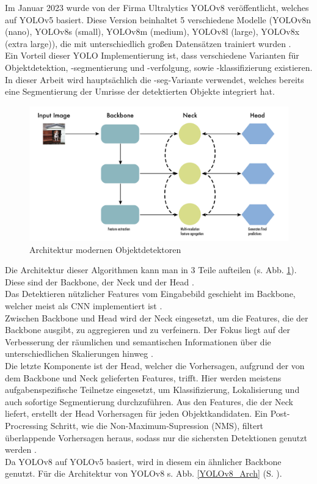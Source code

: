 {{	Im Januar 2023 wurde von der Firma Ultralytics YOLOv8 veröffentlicht, welches auf YOLOv5 basiert. Diese Version beinhaltet 5 verschiedene Modelle (YOLOv8n (nano), YOLOv8s (small), YOLOv8m (medium), YOLOv8l (large), YOLOv8x (extra large)), die mit unterschiedlich großen Datensätzen trainiert wurden  \citep{Terven2023}. \\	
	Ein Vorteil dieser YOLO Implementierung ist, dass verschiedene Varianten für Ob\-jekt\-det\-ekt\-ion, -seg\-men\-tier\-ung und -ver\-fol\-gung, sowie -klas\-si\-fi\-zier\-ung existieren. In dieser Arbeit wird hauptsächlich die \glqq -seg\grqq{}-Variante verwendet, welches bereits eine Segmentierung der Umrisse der detektierten Objekte integriert hat.
	\begin{figure}[h]
		\centering
		\includegraphics*[scale = 0.20, keepaspectratio]{images/YOLO/YOLOv8_object_detector_general.png}
		\caption[Architektur modernen Objektdetektoren]{Architektur modernen Objektdetektoren \citep{Terven2023}}
		\label{YOLO_obj_det_gen}
	\end{figure}
	Die Architektur dieser Algorithmen kann man in 3 Teile aufteilen (s. Abb. \ref{YOLO_obj_det_gen}). Diese sind der Backbone, der Neck und der Head \citep{Terven2023}. \\
	Das Detektieren nützlicher Features vom Eingabebild geschieht im Backbone, welcher meist als CNN implementiert ist \citep{Terven2023}. \\
	Zwischen Backbone und Head wird der Neck eingesetzt, um die Features, die der Backbone ausgibt, zu aggregieren und zu verfeinern. Der Fokus liegt auf der Verbesserung der räumlichen und semantischen Informationen über die unterschiedlichen Skalierungen hinweg \citep{Terven2023}. \\
	Die letzte Komponente ist der Head, welcher die Vorhersagen, aufgrund der von dem Backbone und Neck gelieferten Features, trifft. Hier werden meistens aufgabenspezifische Teilnetze eingesetzt, um Klassifizierung, Lokalisierung und auch sofortige Segmentierung durchzuführen. Aus den Features, die der Neck liefert, erstellt der Head Vorhersagen für jeden Objektkandidaten. Ein Post-Procressing Schritt, wie die Non-Maximum-Supression (NMS), filtert überlappende Vorhersagen heraus, sodass nur die sichersten Detektionen genutzt werden \citep{Terven2023}.\\
	Da YOLOv8 auf YOLOv5 basiert, wird in diesem ein ähnlicher Backbone genutzt. Für die Architektur von YOLOv8 s. Abb. \ref{YOLOv8_Arch} (S. \pageref{YOLOv8_Arch}). 

}}
